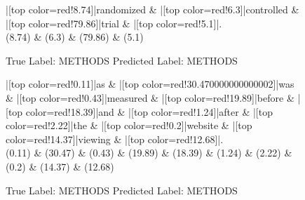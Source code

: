 \documentclass[a4paper, landscape]{article}
\begin{document}
\clearpage
\begin{figure}
\begin{center}
\begin{dependency}
\begin{deptext}
|[top color=red!8.74]|randomized \& |[top color=red!6.3]|controlled \& |[top color=red!79.86]|trial \& |[top color=red!5.1]|.\\
(8.74) \& (6.3) \& (79.86) \& (5.1)\\
\end{deptext}
\end{dependency}
\end{center}
\caption{True Label: METHODS Predicted Label: METHODS}
\end{figure}
\clearpage
\begin{figure}
\begin{center}
\begin{dependency}
\begin{deptext}
|[top color=red!0.11]|as \& |[top color=red!30.470000000000002]|was \& |[top color=red!0.43]|measured \& |[top color=red!19.89]|before \& |[top color=red!18.39]|and \& |[top color=red!1.24]|after \& |[top color=red!2.22]|the \& |[top color=red!0.2]|website \& |[top color=red!14.37]|viewing \& |[top color=red!12.68]|.\\
(0.11) \& (30.47) \& (0.43) \& (19.89) \& (18.39) \& (1.24) \& (2.22) \& (0.2) \& (14.37) \& (12.68)\\
\end{deptext}
\end{dependency}
\end{center}
\caption{True Label: METHODS Predicted Label: METHODS}
\end{figure}
\clearpage
\end{document}
